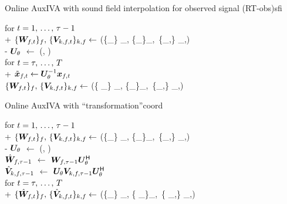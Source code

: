 \documentclass[sip,biber]{now-journal}
\begin{document}
\begin{algorithm}{Online AuxIVA with sound field interpolation for observed signal (RT-obs)}{sfi}
  \begin{pseudo}
    for $t = 1,\, \dots,\, \tau - 1$ \\+
      $\{\Demix _{\ft}\}_{\freq},\, \{\cov _{\src,\ft}\} _{\src,\freq} \gets$ (\{\Obs _{\ft}\} _{\freq}, \{\Demix _{\ft[-1]}\}_{\freq},\, \{\cov _{\src,\ft[-1]}\} _{\src,\freq}) \\-
    $\bm{U} _{\theta}$ $\gets$ (\Mic, \rotDeg) \\
    for $t = \tau,\, \dots,\, T$ \\+
      $\irot{\Obs} _{\ft} \gets \rotMat _{\rotDeg} ^{-1} \Obs _{\ft}$ \ct{$(\forall \freq)$} \\
      $\{\Demix _{\ft}\}_{\freq},\, \{\cov _{\src,\ft}\} _{\src,\freq} \gets$ (\{\irot{\Obs} _{\ft}\} _{\freq}, \{\Demix _{\ft[-1]}\}_{\freq},\, \{\cov _{\src,\ft[-1]}\} _{\src,\freq})
  \end{pseudo}
\end{algorithm}
\begin{algorithm}{Online AuxIVA with ``transformation''}{coord}
  \begin{pseudo}
    for $t = 1,\, \dots,\, \tau - 1$ \\+
      $\{\Demix _{\ft}\}_{\freq},\, \{\cov _{\src,\ft}\} _{\src,\freq} \gets$ (\{\Obs _{\ft}\} _{\freq}, \{\Demix _{\ft[-1]}\}_{\freq},\, \{\cov _{\src,\ft[-1]}\} _{\src,\freq}) \\-
    $\bm{U} _{\theta}$ $\gets$ (\Mic, \rotDeg) \\
    {$\hat{\bm{W}} _{f,\tau - 1}$} $\gets$ $\bm{W} _{f,\tau - 1} \bm{U} _{\theta} ^{\mathsf{H}}$ \ct{$(\forall \freq)$} \\
    {$\hat{\bm{V}} _{k,f,\tau - 1}$} $\gets$ $\bm{U} _{\theta} \bm{V} _{k,f,\tau - 1} \bm{U} _{\theta} ^{\mathsf{H}}$ \ct{$(\forall \src,\freq)$} \\
    for $t = \tau,\, \dots,\, T$ \\+
      $\{\rot{\Demix} _{\ft}\}_{\freq},\, \{\rot{\cov} _{\src,\ft}\} _{\src,\freq} \gets$ (\{\Obs _{\ft}\} _{\freq}, \{\rot{\Demix} _{\ft[-1]}\}_{\freq},\, \{\rot{\cov} _{\src,\ft[-1]}\} _{\src,\freq})
  \end{pseudo}
\end{algorithm}
\end{document}
